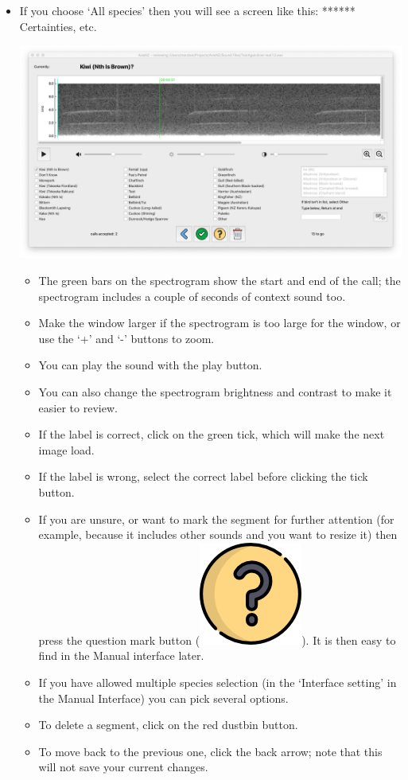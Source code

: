 \documentclass{article}
\begin{document}
\begin{itemize}
\item If you choose `All species' then you will see a screen like this: ****** Certainties, etc.
\begin{center}
	\includegraphics[width=.6\textwidth]{Figures/BatchReview3}
\end{center}

\begin{itemize}
\item The green bars on the spectrogram show the start and end of the call; the spectrogram includes a couple of seconds of context sound too. 
\item Make the window larger if the spectrogram is too large for the window, or use the `+' and `-' buttons to zoom. 
\item You can play the sound with the play button. 
\item You can also change the spectrogram brightness and contrast to make it easier to review. 
\item If the label is correct, click on the green tick, which will make the next image load. 
\item If the label is wrong, select the correct label before clicking the tick button. 
\item If you are unsure, or want to mark the segment for further attention (for example, because it includes other sounds and you want to resize it) then press the question mark button (\includegraphics[scale=0.03]{Figures/questionL}). It is then easy to find in the Manual interface later.
\item If you have allowed multiple species selection (in the `Interface setting' in the Manual Interface) you can pick several options. 
\item To delete a segment, click on the red dustbin button. 
\item To move back to the previous one, click the back arrow; note that this will not save your current changes. 
\end{itemize}


\end{itemize}
\end{document}
